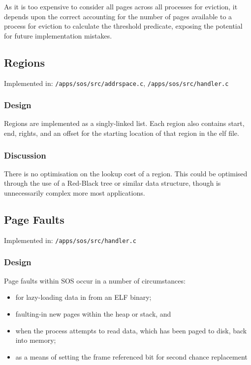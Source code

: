\documentclass[a4paper,12pt]{article}
\begin{document}
As it is too expensive to consider all pages across all processes for
eviction, it depends upon the correct accounting for the number of pages
available to a process for eviction to calculate the threshold predicate,
exposing the potential for future implementation mistakes.

\subsection{Regions}
Implemented in: \texttt{/apps/sos/src/addrspace.c}, \texttt{/apps/sos/src/handler.c}

\subsubsection{Design}
Regions are implemented as a singly-linked list.  Each region also contains
start, end, rights, and an offset for the starting location of that region in
the elf file.

\subsubsection{Discussion}
There is no optimisation on the lookup cost of a region.  This could be
optimised through the use of a Red-Black tree or similar data structure,
though is unnecessarily complex more most applications.

\subsection{Page Faults}
Implemented in: \texttt{/apps/sos/src/handler.c}

\subsubsection{Design}
Page faults within SOS occur in a number of circumstances:

\begin{itemize}
\item for lazy-loading data in from an ELF binary;
\item faulting-in new pages within the heap or stack, and
\item when the process attempts to read data, which has been paged to disk, back into memory;
\item as a means of setting the frame referenced bit for second chance replacement
\end{itemize}
\end{document}
